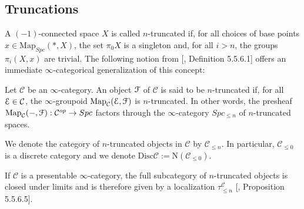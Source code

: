 \subsection{Truncations}
A $(-1)$-connected space $X$ is called $n$-truncated if, for all choices of base points $x\in \mathrm{Map}_{Spc}(*,X)$, the set $\pi_0X$ is a singleton and, for all $i>n$, the groups $\pi_i(X,x)$ are trivial. The following notion from [\cite{lurie2009higher}, Definition 5.5.6.1] offers an immediate $\infty$-categorical generalization of this concept:
\begin{defn}
 Let $\mathcal{C}$ be an $\infty$-category. An object $\EuScript{F}$ of $\mathcal{C}$ is said to be $n$-truncated if, for all $\EuScript{E}\in \mathcal{C}$, the $\infty$-groupoid $\mathrm{Map}_\mathcal{C}(\EuScript{E},\EuScript{F})$ is $n$-truncated. In other words, the presheaf $\mathrm{Map}_{\mathcal{C}}(-,\EuScript{F}):\mathcal{C}^{op}\to Spc$ factors through the $\infty$-category $Spc_{\leq n}$ of $n$-truncated spaces. 
\end{defn}


We denote the category of $n$-truncated objects in $\mathcal{C}$ by $\mathcal{C}_{\leq n}$. In particular, $\mathcal{C}_{\leq 0}$ is a discrete category and we denote $\text{Disc}\mathcal{C}:=\text{N}(\mathcal{C}_{\leq 0})$.

If $\mathcal{C}$ is a presentable $\infty$-category, the full subcategory of $n$-truncated objects is closed under limits and is therefore given by a localization $\tau_{\leq n}^\mathcal{C}$ [\cite{lurie2009higher}, Proposition 5.5.6.5]. 

